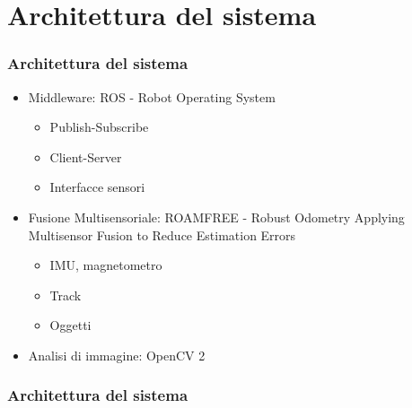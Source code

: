 \documentclass[c]{beamer}
\begin{document}

\section{Architettura del sistema}
\begin{frame}
\frametitle{Architettura del sistema}

\begin{itemize}
\item Middleware: ROS - Robot Operating System
\begin{itemize}
 \item Publish-Subscribe
 \item Client-Server
 \item Interfacce sensori
\end{itemize}

\item Fusione Multisensoriale: ROAMFREE - Robust Odometry Applying Multisensor Fusion to Reduce Estimation Errors
\begin{itemize}
 \item IMU, magnetometro
 \item Track
 \item Oggetti
\end{itemize}

\item Analisi di immagine: OpenCV 2
\end{itemize}

\end{frame}


\begin{frame}
\frametitle{Architettura del sistema}


\end{frame}
\end{document}
